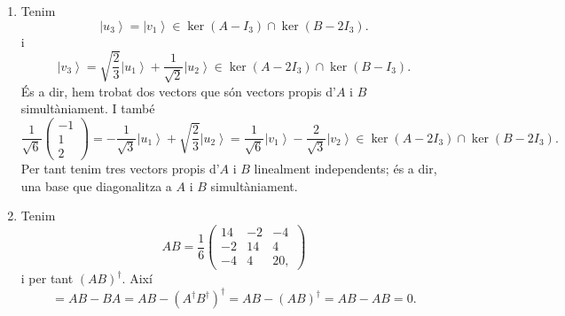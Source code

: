 \documentclass[12pt]{article}
\numberwithin{table}{section}
\numberwithin{figure}{section}
\numberwithin{equation}{section}
\newcommand{\ket}[1]{\left\lvert #1 \right\rangle}
\begin{document}
\begin{enumerate}[label=(\alph*), font=\bfseries \sffamily, wide, labelwidth=!, labelindent=0pt]
\item Tenim
	\begin{equation*}
		\ket{u_3} = \ket{v_1} \in \ker{(A-I_3)} \cap \ker{(B-2I_3)}.
	\end{equation*}
i
\begin{equation*}
	\ket{v_3} = \sqrt{\frac{2}{3}} \ket{u_1} + \frac{1}{\sqrt{2}} \ket{u_2} \in \ker{(A-2I_3)} \cap \ker{(B-I_3)}.
\end{equation*}
És a dir, hem trobat dos vectors que són vectors propis d'\( A \) i \( B \) simultàniament. I també
\begin{equation*}
	\frac{1}{\sqrt{6}}\begin{pmatrix}
		-1\\1\\2
	\end{pmatrix} = -\frac{1}{\sqrt{3}}\ket{u_1} + \sqrt{\frac{2}{3}}\ket{u_2} = \frac{1}{\sqrt{6}}\ket{v_1} - \frac{2}{\sqrt{3}}\ket{v_2} \in \ker{(A - 2I_3)} \cap \ker{(B-2I_3)}.
\end{equation*}
Per tant tenim tres vectors propis d'\( A \) i \( B \) linealment independents; és a dir, una base que diagonalitza a \( A \) i \( B \) simultàniament. 
	
\item	Tenim
	\begin{equation*}
	AB = \frac{1}{6} \begin{pmatrix}
		14 & -2 & -4 \\
		-2 & 14 & 4 \\
		-4 & 4 & 20,
	\end{pmatrix}
	\end{equation*}
	i per tant \( (AB)^{\dagger} \). Així
	\begin{equation*}
		[A,B] = AB - BA = AB - (A^{\dagger}B^{\dagger})^{\dagger} = AB - (AB)^{\dagger} = AB - AB = 0. 
	\end{equation*}
	

\end{enumerate}
\end{document}
